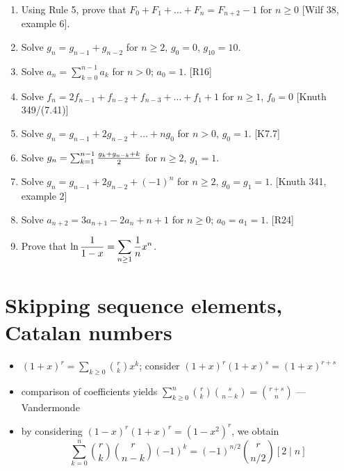 \documentclass[10pt, a4paper]{article}
\newcommand*\ruleline[1]{\par\noindent\raisebox{.8ex}{\makebox[\linewidth]{\hrulefill\hspace{1ex}\raisebox{-.8ex}{#1}\hspace{1ex}\hrulefill}}}
\def\ans#1{\big[\hskip 2mm {#1}\hskip 2mm\big]}
\begin{document}
\ruleline{Exercises}

\begin{enumerate}
    \item Using Rule 5, prove that $F_0+F_1+\dots+F_n=F_{n+2}-1$ for $n\ge 0$ [Wilf 38, example 6].\\
        \ans{Compare gfs of both sides, left is $f/(1-x)$, where $f = x/(1-x-x^2)$, i.e. Fibonacci.}
    \item Solve $g_n=g_{n-1}+g_{n-2}$ for $n\ge 2$, $g_0 = 0$, $g_{10} = 10$.\\
        \ans{$g_n = {g_{10}\over F_{10}}F_n$, try the ``boundary method'' described above, computer necessary}
    \item Solve $a_n = \sum_{k=0}^{n-1}a_k$ for $n > 0$; $a_0 = 1$. [R16]\\
        \ans{$a_n = 2^{n-1}$ for $n \ge 1$}
    \item Solve $f_n=2f_{n-1}+f_{n-2}+f_{n-3}+\dots+f_1+1$ for $n\ge 1$, $f_0 = 0$ [Knuth 349/(7.41)]\\
        \ans{$F(x) = x/(1-3x+x^2)$; $f_n=F_{2n}$}
    \item Solve $g_n = g_{n-1} + 2g_{n-2}+\dots +ng_0$ for $n> 0$, $g_0 = 1$. [K7.7]\\
        \ans{$G(x)=1+x/(1-3x+x^2)$; $g_n=F_{2n} + [n=0]$}
    \item Solve $g_n = \sum_{k=1}^{n-1} {g_k + g_{n-k} + k\over 2}$ for $n\ge 2$, $g_1 = 1$.
    \item Solve $g_n=g_{n-1}+2g_{n-2}+(-1)^n$ for $n\ge 2$, $g_0 = g_1 = 1$. [Knuth 341, example 2]\\
        \ans{$G(x) = {1+x+x^2\over (1-2x)(1+x)^2}$; $g_n = {7\over 9}2^n + {1\over 9}(3n+2)(-1)^n$}
    \item Solve $a_{n+2}=3a_{n+1}-2a_n+n+1$ for $n\ge 0$; $a_0 = a_1 = 1$. [R24]\\
        \ans{$A(z) = {2\over 1-2z}-{1\over (1-z)^3}$; $a_n = 2^{n+1}-{n+2\choose 2}$}
    \item Prove that $\displaystyle \ln {1\over 1-x} = \sum_{n\ge 1} {1\over n} x^n$. \ans{consider $\int {1\over 1-x}$}
\end{enumerate}



\section{Skipping sequence elements, Catalan numbers}


\ruleline{Discovering combinatorial identities via gfs [Knuth 198, Vandermonde and 5.55]}
\begin{itemize}
    \item $(1+x)^r = \sum_{k\ge 0} {r\choose k}x^k$; consider $(1+x)^r(1+x)^s = (1+x)^{r+s}$
    \item comparison of coefficients yields $\sum_{k\ge 0}^n {r\choose k}{s\choose n-k}={r+s\choose n}$ --- Vandermonde
    \item by considering $(1-x)^r(1+x)^r = (1-x^2)^r$, we obtain $$\sum_{k=0}^n {r\choose k}{r\choose n-k}(-1)^k = (-1)^{n/2}{r\choose n/2}[2\mid n]$$
\end{itemize}
\end{document}
